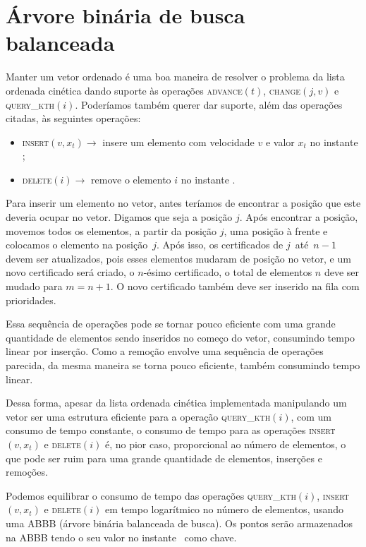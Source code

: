 
\section{Árvore binária de busca balanceada} \label{abb}

Manter um vetor ordenado é uma boa maneira de resolver o problema da
lista ordenada cinética dando suporte às operações
\textsc{advance}$(t)$, \textsc{change}$(j,v)$ e
\textsc{query\_kth}$(i)$. Poderíamos também querer dar suporte, além
das operações citadas, às seguintes operações:
\begin{itemize}
    \item \textsc{insert}$(v, x_t) \rightarrow$ insere um
    elemento com velocidade $v$ e valor $x_t$ no instante \now;
    \item \textsc{delete}$(i) \rightarrow$ remove o elemento
    $i$ no instante \now.
\end{itemize}
Para inserir um elemento no vetor, antes teríamos de encontrar a
posição que este deveria ocupar no vetor. Digamos que seja a
posição $j$. Após encontrar a posição, movemos todos os
elementos, a partir da posição $j$, uma posição à frente e
colocamos o elemento na posição~$j$. Após isso, os certificados
de $j$~até~$n - 1$ devem ser atualizados, pois esses elementos
mudaram de posição no vetor, e um novo certificado será criado,
o $n$-ésimo certificado, o total de elementos $n$ deve ser
mudado para $m = n + 1$. O novo certificado também deve ser
inserido na fila com prioridades.

Essa sequência de operações pode se tornar pouco eficiente com
uma grande quantidade de elementos sendo inseridos no começo do
vetor, consumindo tempo linear por inserção. Como a remoção
envolve uma sequência de operações parecida, da mesma maneira se
torna pouco eficiente, também consumindo tempo linear.

Dessa forma, apesar da lista ordenada cinética implementada
manipulando um vetor ser uma estrutura eficiente para a operação
\textsc{query\_kth}$(i)$, com um consumo de tempo constante,
o consumo de tempo para as operações \textsc{insert}$(v, x_t)$ e
\textsc{delete}$(i)$ é, no pior caso, proporcional ao número de
elementos, o que pode ser ruim para uma grande quantidade de
elementos, inserções e remoções.

Podemos equilibrar o consumo de tempo das operações
\textsc{query\_kth}$(i)$, \textsc{insert}$(v, x_t)$ e
\textsc{delete}$(i)$ em tempo logarítmico no número de elementos,
usando uma ABBB (árvore binária balanceada de busca). Os pontos
serão armazenados na ABBB tendo o seu valor no instante \now~como
chave.

